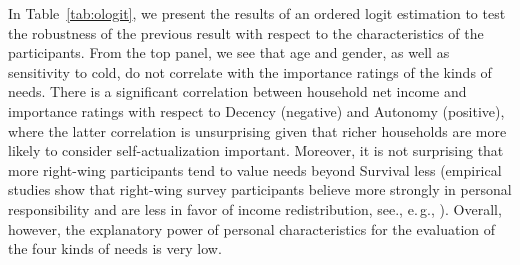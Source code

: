 \documentclass[10pt,letterpaper]{article}
\begin{document}
In Table~\ref{tab:ologit}, we present the results of an ordered logit estimation to test the robustness of the previous result with respect to the characteristics of the participants.
From the top panel, we see that age and gender, as well as sensitivity to cold, do not correlate with the importance ratings of the kinds of needs.
There is a significant correlation between household net income and importance ratings with respect to Decency (negative) and Autonomy (positive), where the latter correlation is unsurprising given that richer households are more likely to consider self-actualization important.
Moreover, it is not surprising that more right-wing participants tend to value needs beyond Survival less (empirical studies show that right-wing survey participants believe more strongly in personal responsibility and are less in favor of income redistribution, see., e.\,g., \cite{olivera_preferences_2015,alesina_intergenerational_2018}).
Overall, however, the explanatory power of personal characteristics for the evaluation of the four kinds of needs is very low.
\end{document}

